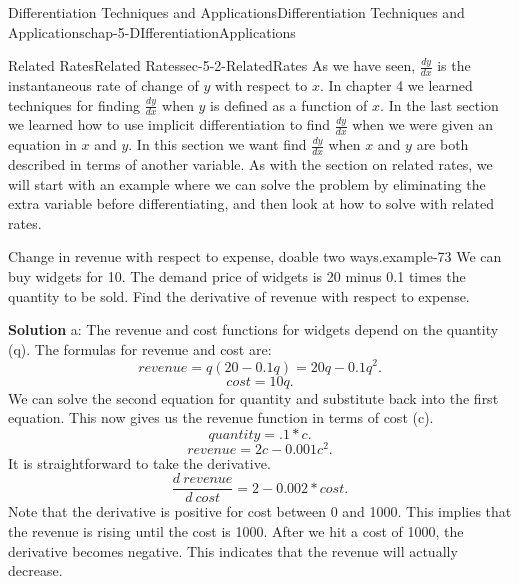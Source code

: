 \documentclass[oneside,10pt,]{book}
\newcommand{\terminology}[1]{\textbf{#1}}
\numberwithin{equation}{section}
\begin{document}
\begin{chapterptx}{Differentiation Techniques and Applications}{}{Differentiation Techniques and Applications}{}{}{chap-5-DIfferentiationApplications}
\typeout{************************************************}
%
\begin{sectionptx}{Related Rates}{}{Related Rates}{}{}{sec-5-2-RelatedRates}
\hypertarget{p-1934}{}%
As we have seen, \(\frac{dy}{dx}\) is the instantaneous rate of change of \(y\) with respect to \(x\).  In chapter 4 we learned techniques for finding \(\frac{dy}{dx}\) when \(y\) is defined as a function of \(x\).  In the last section we learned how to use implicit differentiation to find \(\frac{dy}{dx}\) when we were given an equation in \(x\) and \(y\).  In this section we want find \(\frac{dy}{dx}\) when \(x\) and \(y\) are both described in terms of another variable.  As with the section on related rates, we will start with an example where we can solve the problem by eliminating the extra variable before differentiating, and then look at how to solve with related rates.%
\begin{example}{Change in revenue with respect to expense, doable two ways.}{example-73}%
\hypertarget{p-1935}{}%
We can buy widgets for \textdollar{}10.  The demand price of widgets is \textdollar{}20 minus 0.1 times the quantity to be sold.  Find the derivative of revenue with respect to expense.%
\par
\hypertarget{p-1936}{}%
\terminology{Solution} a: The revenue and cost functions for widgets depend on the quantity (q). The formulas for revenue and cost are:%
%
\begin{equation*}
revenue=q(20-0.1q)=20q-0.1q^2.
\end{equation*}
%
\begin{equation*}
cost=10q.
\end{equation*}
\hypertarget{p-1937}{}%
We can solve the second equation for quantity and substitute back into the first equation. This now gives us the revenue function in terms of cost (c).%
%
\begin{equation*}
quantity =.1*c.
\end{equation*}
%
\begin{equation*}
revenue=2c-0.001 c^2.
\end{equation*}
\hypertarget{p-1938}{}%
It is straightforward to take the derivative.%
%
\begin{equation*}
\frac{d\ revenue}{d\ cost}=2-0.002*cost.
\end{equation*}
\hypertarget{p-1939}{}%
Note that the derivative is positive for cost between \textdollar{}0 and \textdollar{}1000. This implies that the revenue is rising until the cost is \textdollar{}1000. After we hit a cost of \textdollar{}1000, the derivative becomes negative. This indicates that the revenue will actually decrease.%

\end{example}
\end{sectionptx}
\end{chapterptx}
\end{document}
